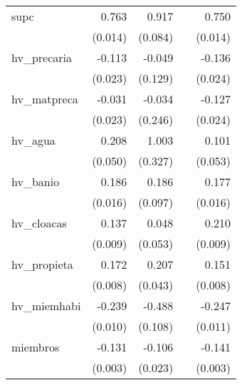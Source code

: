 {\begin{longtable}{l*{4}{D{.}{.}{-1}}}
\addlinespace
supc        &       0.763\sym{***}&       0.917\sym{***}&                     &       0.750\sym{***}\\
            &     (0.014)         &     (0.084)         &                     &     (0.014)         \\
\addlinespace
hv\_precaria &      -0.113\sym{***}&      -0.049         &                     &      -0.136\sym{***}\\
            &     (0.023)         &     (0.129)         &                     &     (0.024)         \\
\addlinespace
hv\_matpreca &      -0.031         &      -0.034         &                     &      -0.127\sym{***}\\
            &     (0.023)         &     (0.246)         &                     &     (0.024)         \\
\addlinespace
hv\_agua     &       0.208\sym{***}&       1.003\sym{**} &                     &       0.101         \\
            &     (0.050)         &     (0.327)         &                     &     (0.053)         \\
\addlinespace
hv\_banio    &       0.186\sym{***}&       0.186         &                     &       0.177\sym{***}\\
            &     (0.016)         &     (0.097)         &                     &     (0.016)         \\
\addlinespace
hv\_cloacas  &       0.137\sym{***}&       0.048         &                     &       0.210\sym{***}\\
            &     (0.009)         &     (0.053)         &                     &     (0.009)         \\
\addlinespace
hv\_propieta &       0.172\sym{***}&       0.207\sym{***}&                     &       0.151\sym{***}\\
            &     (0.008)         &     (0.043)         &                     &     (0.008)         \\
\addlinespace
hv\_miemhabi &      -0.239\sym{***}&      -0.488\sym{***}&                     &      -0.247\sym{***}\\
            &     (0.010)         &     (0.108)         &                     &     (0.011)         \\
\addlinespace
miembros    &      -0.131\sym{***}&      -0.106\sym{***}&                     &      -0.141\sym{***}\\
            &     (0.003)         &     (0.023)         &                     &     (0.003)         \\

\end{longtable}}
